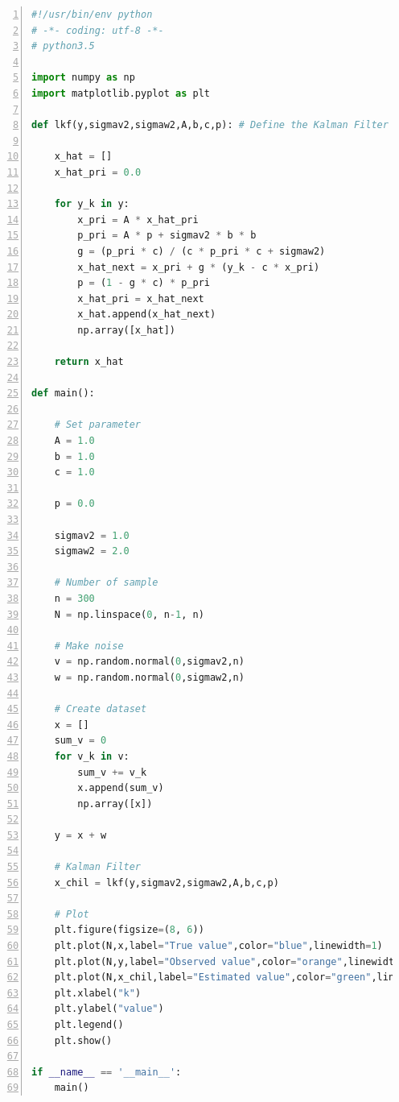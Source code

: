 \documentclass[a4paper,11pt]{jarticle}
\begin{document}
\begin{lstlisting}[basicstyle=\ttfamily\footnotesize,frame=single,numbers=left,language=Python,caption=ソースコード]
#!/usr/bin/env python
# -*- coding: utf-8 -*-
# python3.5

import numpy as np
import matplotlib.pyplot as plt

def lkf(y,sigmav2,sigmaw2,A,b,c,p): # Define the Kalman Filter

    x_hat = []
    x_hat_pri = 0.0

    for y_k in y:
        x_pri = A * x_hat_pri
        p_pri = A * p + sigmav2 * b * b
        g = (p_pri * c) / (c * p_pri * c + sigmaw2)
        x_hat_next = x_pri + g * (y_k - c * x_pri)
        p = (1 - g * c) * p_pri
        x_hat_pri = x_hat_next
        x_hat.append(x_hat_next)
        np.array([x_hat])

    return x_hat

def main():

    # Set parameter
    A = 1.0
    b = 1.0
    c = 1.0

    p = 0.0

    sigmav2 = 1.0
    sigmaw2 = 2.0

    # Number of sample
    n = 300
    N = np.linspace(0, n-1, n)

    # Make noise
    v = np.random.normal(0,sigmav2,n)
    w = np.random.normal(0,sigmaw2,n)

    # Create dataset
    x = []
    sum_v = 0
    for v_k in v:
        sum_v += v_k
        x.append(sum_v)
        np.array([x])

    y = x + w

    # Kalman Filter
    x_chil = lkf(y,sigmav2,sigmaw2,A,b,c,p)

    # Plot
    plt.figure(figsize=(8, 6))
    plt.plot(N,x,label="True value",color="blue",linewidth=1)
    plt.plot(N,y,label="Observed value",color="orange",linewidth=1)
    plt.plot(N,x_chil,label="Estimated value",color="green",linewidth=1)
    plt.xlabel("k")
    plt.ylabel("value")
    plt.legend()
    plt.show()

if __name__ == '__main__':
    main()
\end{lstlisting}



\end{document}
